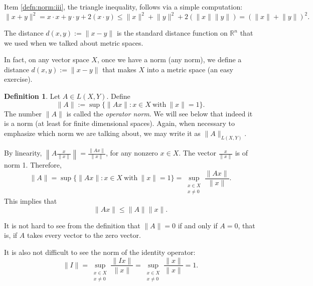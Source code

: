 \documentclass[12pt]{book}
\newcommand{\snorm}[1]{\lVert {#1} \rVert}
\newcommand{\norm}[1]{\left\lVert {#1} \right\rVert}
\newcommand{\R}{{\mathbb{R}}}
\newcommand{\myindex}[1]{#1\index{#1}}
\theoremstyle{plain}
\theoremstyle{remark}
\theoremstyle{definition}
\newtheorem{defn}[thm]{Definition}
\theoremstyle{exercise}
\theoremstyle{example}
\begin{document}
Item \ref{defn:norm:iii}, the triangle inequality, follows via a simple computation:
\begin{equation*}
\snorm{x+y}^2 
=
x \cdot x + y \cdot y + 2 (x \cdot y)
\leq
\snorm{x}^2 + \snorm{y}^2 + 2 (\snorm{x}\snorm{y})
=
{(\snorm{x} + \snorm{y})}^2 .
\end{equation*}

The distance
$d(x,y) := \snorm{x-y}$ is the standard
distance function on $\R^n$ that we used when we talked about metric spaces.

In fact, on any vector space $X$, once we
have a norm (any norm),
we define a distance $d(x,y) := \snorm{x-y}$ that makes $X$ into
a metric space (an easy exercise).

\begin{defn}
Let $A \in L(X,Y)$.  Define
\begin{equation*}
\snorm{A} :=
\sup \{ \snorm{Ax} : x \in X ~ \text{with} ~ \snorm{x} = 1 \} .
\end{equation*}
The number $\snorm{A}$ is called the \emph{\myindex{operator norm}}.  We will see below
that indeed it is a norm (at least for finite dimensional spaces).
Again, when necessary to emphasize which norm we are talking about, we may
write it as $\snorm{A}_{L(X,Y)}$.
\end{defn}

By linearity,
$\norm{A \frac{x}{\snorm{x}}} = \frac{\snorm{Ax}}{\snorm{x}}$,
for any nonzero $x \in X$.
The vector $\frac{x}{\snorm{x}}$ is of norm 1.
Therefore,
\begin{equation*}
\snorm{A} =
\sup \{ \snorm{Ax} : x \in X ~ \text{with} ~ \snorm{x} = 1 \}
=
\sup_{\substack{x \in X\\x\neq 0}} \frac{\snorm{Ax}}{\snorm{x}} .
\end{equation*}
This implies that
\begin{equation*}
\snorm{Ax} \leq \snorm{A}  \snorm{x} .
\end{equation*}

It is not hard to see from the definition that $\snorm{A} = 0$ if and
only if $A = 0$, that is, if $A$ takes every vector to the zero vector.

It is also not difficult to see the norm of the identity operator:
\begin{equation*}
\snorm{I} =
\sup_{\substack{x \in X\\x\neq 0}} \frac{\snorm{Ix}}{\snorm{x}} 
=
\sup_{\substack{x \in X\\x\neq 0}} \frac{\snorm{x}}{\snorm{x}} 
= 1.
\end{equation*}
\end{document}
